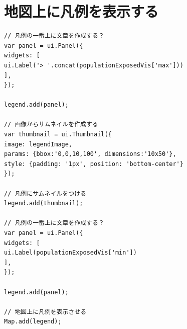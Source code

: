 \documentclass[
]{book}
\begin{document}
\hypertarget{ux5730ux56f3ux4e0aux306bux51e1ux4f8bux3092ux8868ux793aux3059ux308b}{%
\section{地図上に凡例を表示する}\label{ux5730ux56f3ux4e0aux306bux51e1ux4f8bux3092ux8868ux793aux3059ux308b}}

\begin{verbatim}
// 凡例の一番上に文章を作成する？
var panel = ui.Panel({
widgets: [
ui.Label('> '.concat(populationExposedVis['max']))
],
});
 
legend.add(panel);
 
// 画像からサムネイルを作成する
var thumbnail = ui.Thumbnail({
image: legendImage,
params: {bbox:'0,0,10,100', dimensions:'10x50'},
style: {padding: '1px', position: 'bottom-center'}
});
 
// 凡例にサムネイルをつける
legend.add(thumbnail);
 
// 凡例の一番上に文章を作成する？
var panel = ui.Panel({
widgets: [
ui.Label(populationExposedVis['min'])
],
});
 
legend.add(panel);
 
// 地図上に凡例を表示させる
Map.add(legend);
\end{verbatim}

  
\end{document}
